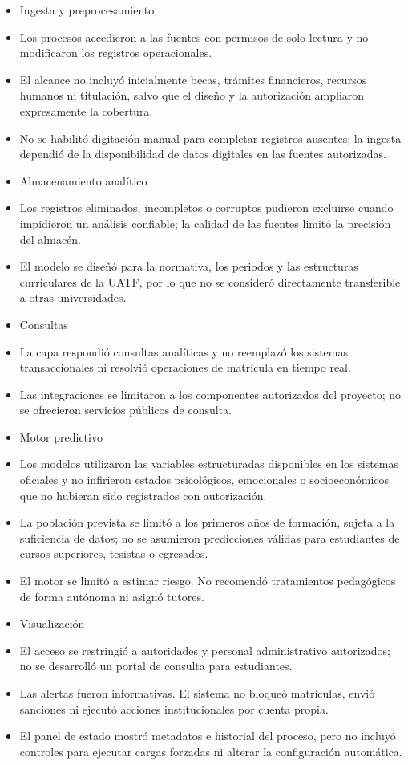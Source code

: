 \documentclass[11pt,oneside,openany]{book}
\begin{document}
\begin{itemize}[leftmargin=*]
\item Ingesta y preprocesamiento
\item Los procesos accedieron a las fuentes con permisos de solo lectura y no modificaron los registros operacionales.
\item El alcance no incluyó inicialmente becas, trámites financieros, recursos humanos ni titulación, salvo que el diseño y la autorización ampliaron expresamente la cobertura.
\item No se habilitó digitación manual para completar registros ausentes; la ingesta dependió de la disponibilidad de datos digitales en las fuentes autorizadas.
\item Almacenamiento analítico
\item Los registros eliminados, incompletos o corruptos pudieron excluirse cuando impidieron un análisis confiable; la calidad de las fuentes limitó la precisión del almacén.
\item El modelo se diseñó para la normativa, los periodos y las estructuras curriculares de la UATF, por lo que no se consideró directamente transferible a otras universidades.
\item Consultas
\item La capa respondió consultas analíticas y no reemplazó los sistemas transaccionales ni resolvió operaciones de matrícula en tiempo real.
\item Las integraciones se limitaron a los componentes autorizados del proyecto; no se ofrecieron servicios públicos de consulta.
\item Motor predictivo
\item Los modelos utilizaron las variables estructuradas disponibles en los sistemas oficiales y no infirieron estados psicológicos, emocionales o socioeconómicos que no hubieran sido registrados con autorización.
\item La población prevista se limitó a los primeros años de formación, sujeta a la suficiencia de datos; no se asumieron predicciones válidas para estudiantes de cursos superiores, tesistas o egresados.
\item El motor se limitó a estimar riesgo. No recomendó tratamientos pedagógicos de forma autónoma ni asignó tutores.
\item Visualización
\item El acceso se restringió a autoridades y personal administrativo autorizados; no se desarrolló un portal de consulta para estudiantes.
\item Las alertas fueron informativas. El sistema no bloqueó matrículas, envió sanciones ni ejecutó acciones institucionales por cuenta propia.
\item El panel de estado mostró metadatos e historial del proceso, pero no incluyó controles para ejecutar cargas forzadas ni alterar la configuración automática.
\end{itemize}
\end{document}
